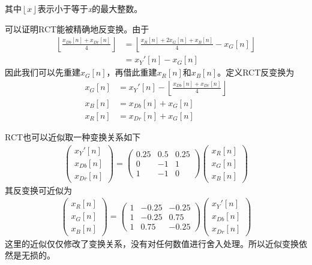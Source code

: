 其中$\left \lfloor \textit{x} \right \rfloor$表示小于等于\textit{x}的最大整数。\par
可以证明RCT能被精确地反变换。由于
\begin{equation}
\begin{aligned}
\left \lfloor \frac{x_{Db}[n]+x_{Dr}[n]}{4} \right \rfloor
&=\left \lfloor \frac{x_{R}[n]+2x_{G}[n]+x_{B}[n]}{4}-x_{G}[n] \right \rfloor\\
&=x_{Y}'[n]-x_{G}[n]
\end{aligned}
\end{equation}
因此我们可以先重建$x_{G}[n]$，再借此重建$x_{R}[n]$和$x_{B}[n]$。定义RCT反变换为
\begin{equation}
\begin{aligned}
x_{G}[n]&=x_{Y}'[n]-\left \lfloor \frac{x_{Db}[n]+x_{Dr}[n]}{4} \right \rfloor\\
x_{B}[n]&=x_{Db}[n]+x_{G}[n]\\
x_{R}[n]&=x_{Dr}[n]+x_{G}[n]
\end{aligned}
\end{equation}

RCT也可以近似取一种变换关系如下
\begin{equation}
\begin{aligned}
\left(
\begin{array}{c}
x_{Y}'[n]\\
x_{Db}[n]\\
x_{Dr}[n]
\end{array}
\right)
=
\left(
\begin{array}{ccc}
0.25 & 0.5 & 0.25\\
0 & -1 & 1\\
1 & -1 & 0
\end{array}
\right)
\left(
\begin{array}{c}
x_{R}[n]\\
x_{G}[n]\\
x_{B}[n]
\end{array}
\right)
\end{aligned}
\end{equation}
其反变换可近似为
\begin{equation}
\begin{aligned}
\left(
\begin{array}{c}
x_{R}[n]\\
x_{G}[n]\\
x_{B}[n]
\end{array}
\right)
=
\left(
\begin{array}{ccc}
1 & -0.25 & -0.25\\
1 & -0.25 & 0.75\\
1 & 0.75 & -0.25
\end{array}
\right)
\left(
\begin{array}{c}
x_{Y}'[n]\\
x_{Db}[n]\\
x_{Dr}[n]
\end{array}
\right)
\end{aligned}
\end{equation}
这里的近似仅仅修改了变换关系，没有对任何数值进行舍入处理。所以近似变换依然是无损的。